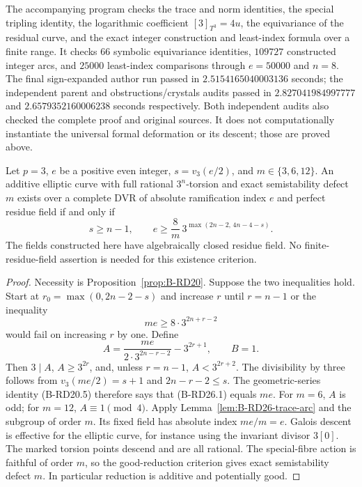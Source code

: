 \begin{remark}\label{auto:B:10f3741cc5dc}

The accompanying program 
checks the trace and norm identities, the special tripling
identity, the logarithmic coefficient $[3]_{T^3}=4u$, the
equivariance of the residual curve, and the exact integer
construction and least-index formula over a finite range.
It checks $66$ symbolic equivariance identities, $109727$ constructed
integer arcs, and $25000$ least-index comparisons through $e=50000$
and $n=8$. The final sign-expanded author run passed in
$2.5154165040003136$ seconds; the independent parent and
obstructions/crystals audits passed in $2.827041984997777$ and
$2.6579352160006238$ seconds respectively. Both independent
audits also checked the complete proof and original sources.
It does not computationally instantiate the universal formal
deformation or its descent; those are proved above.
\end{remark}

\begin{theorem}
\label{thm:B-RD26-wild}
Let $p=3$, $e$ be a positive even integer, $s=v_3(e/2)$, and
$m\in\{3,6,12\}$. An additive elliptic curve with full rational
$3^n$-torsion and exact semistability defect $m$ exists over a
complete DVR of absolute ramification index $e$ and perfect
residue field if and only if
\[
 s\geq n-1,\qquad
 e\geq\frac8m\,3^{\max(2n-2,\,4n-4-s)}.              \tag{B-RD26.10}
\]
The fields constructed here have algebraically closed residue
field. No finite-residue-field assertion is needed for this
existence criterion.
\end{theorem}

\begin{proof}
Necessity is Proposition~\ref{prop:B-RD20}. Suppose the two
inequalities hold. Start at $r_0=\max(0,2n-2-s)$ and increase
$r$ until $r=n-1$ or the inequality
\[
                 me\geq8\cdot3^{2n+r-2}
\]
would fail on increasing $r$ by one. Define
\[
       A=\frac{me}{2\cdot3^{2n-r-2}}-3^{2r+1},
       \qquad B=1.                                    \tag{B-RD26.11}
\]
Then $3\mid A$, $A\geq3^{2r}$, and, unless $r=n-1$,
$A<3^{2r+2}$. The divisibility by three follows from
$v_3(me/2)=s+1$ and $2n-r-2\leq s$.
The geometric-series identity (B-RD20.5) therefore says that
(B-RD26.1) equals $me$. For $m=6$, $A$ is odd; for $m=12$,
$A\equiv1\pmod4$. Apply Lemma~\ref{lem:B-RD26-trace-arc}
and the subgroup of order $m$. Its fixed field has absolute
index $me/m=e$. Galois descent is effective for the elliptic
curve, for instance using the invariant divisor $3[0]$.
The marked torsion points descend and are all rational.
The special-fibre action is faithful of order $m$, so the
good-reduction criterion gives exact semistability defect $m$.
In particular reduction is additive and potentially good.
\end{proof}

